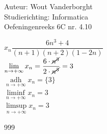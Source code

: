 \documentclass[a4paper]{article}
\newcommand{\Limit}{\lim\limits_}
\begin{document}
  
\noindent \large Auteur: Wout Vanderborght\\
\noindent \large Studierichting: Informatica\\
\noindent \large Oefeningenreeks 6C nr. 4.10\\

\medskip

\normalsize

$ x_n \dfrac{6n^3+4}{(n+1)(n+2)(1-2n)} $ \\

$ \Limit{n \rightarrow +\infty} x_n = \dfrac{6 \cdot \cancel{n^3}}{2 \cdot \cancel{n^3}} = 3 $ \\

$ \mathop{\operatorname{adh}}\limits_{n \rightarrow +\infty} x_n = \{3\} $ \\

$ \liminf\limits_{n \rightarrow +\infty} x_n = 3 $ \\

$ \limsup\limits_{n \rightarrow +\infty} x_n = 3 $ \\

\begin{thebibliography}{999}
\end{thebibliography}
\end{document}
